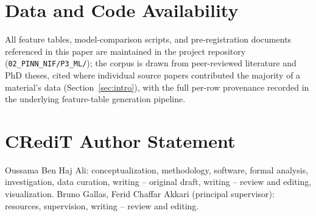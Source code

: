\documentclass[aip,amsmath,amssymb,reprint]{revtex4-1}
\begin{document}
\section*{Data and Code Availability}
All feature tables, model-comparison scripts, and pre-registration
documents referenced in this paper are maintained in the project
repository (\texttt{02\_PINN\_NIF/P3\_ML/}); the corpus is drawn from
peer-reviewed literature and PhD theses, cited where individual source
papers contributed the majority of a material's data
(Section~\ref{sec:intro}), with the full per-row provenance recorded
in the underlying feature-table generation pipeline.

\section*{CRediT Author Statement}
Oussama Ben Haj Ali: conceptualization, methodology, software,
formal analysis, investigation, data curation, writing -- original
draft, writing -- review and editing, visualization. Bruno Gallas,
Ferid Chaffar Akkari (principal supervisor): resources, supervision, writing
-- review and editing.



\end{document}
